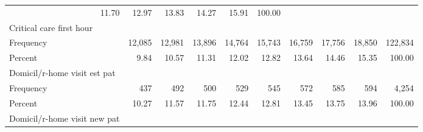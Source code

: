\documentclass{article}
\begin{document}
\begin{table}[!h]
\begin{tabular}{llllllllll}
  \multicolumn{1}{r}{11.70} &
  \multicolumn{1}{r}{12.97} &
  \multicolumn{1}{r}{13.83} &
  \multicolumn{1}{r}{14.27} &
  \multicolumn{1}{r}{15.91} &
  \multicolumn{1}{r}{100.00} \\
\multicolumn{1}{l}{\hspace{1em}Critical care first hour} &
  \multicolumn{1}{|r}{} &
  \multicolumn{1}{r}{} &
  \multicolumn{1}{r}{} &
  \multicolumn{1}{r}{} &
  \multicolumn{1}{r}{} &
  \multicolumn{1}{r}{} &
  \multicolumn{1}{r}{} &
  \multicolumn{1}{r}{} &
  \multicolumn{1}{r}{} \\
\multicolumn{1}{l}{\hspace{2em}Frequency} &
  \multicolumn{1}{|r}{12,085} &
  \multicolumn{1}{r}{12,981} &
  \multicolumn{1}{r}{13,896} &
  \multicolumn{1}{r}{14,764} &
  \multicolumn{1}{r}{15,743} &
  \multicolumn{1}{r}{16,759} &
  \multicolumn{1}{r}{17,756} &
  \multicolumn{1}{r}{18,850} &
  \multicolumn{1}{r}{122,834} \\
\multicolumn{1}{l}{\hspace{2em}Percent} &
  \multicolumn{1}{|r}{9.84} &
  \multicolumn{1}{r}{10.57} &
  \multicolumn{1}{r}{11.31} &
  \multicolumn{1}{r}{12.02} &
  \multicolumn{1}{r}{12.82} &
  \multicolumn{1}{r}{13.64} &
  \multicolumn{1}{r}{14.46} &
  \multicolumn{1}{r}{15.35} &
  \multicolumn{1}{r}{100.00} \\
\multicolumn{1}{l}{\hspace{1em}Domicil/r-home visit est pat} &
  \multicolumn{1}{|r}{} &
  \multicolumn{1}{r}{} &
  \multicolumn{1}{r}{} &
  \multicolumn{1}{r}{} &
  \multicolumn{1}{r}{} &
  \multicolumn{1}{r}{} &
  \multicolumn{1}{r}{} &
  \multicolumn{1}{r}{} &
  \multicolumn{1}{r}{} \\
\multicolumn{1}{l}{\hspace{2em}Frequency} &
  \multicolumn{1}{|r}{437} &
  \multicolumn{1}{r}{492} &
  \multicolumn{1}{r}{500} &
  \multicolumn{1}{r}{529} &
  \multicolumn{1}{r}{545} &
  \multicolumn{1}{r}{572} &
  \multicolumn{1}{r}{585} &
  \multicolumn{1}{r}{594} &
  \multicolumn{1}{r}{4,254} \\
\multicolumn{1}{l}{\hspace{2em}Percent} &
  \multicolumn{1}{|r}{10.27} &
  \multicolumn{1}{r}{11.57} &
  \multicolumn{1}{r}{11.75} &
  \multicolumn{1}{r}{12.44} &
  \multicolumn{1}{r}{12.81} &
  \multicolumn{1}{r}{13.45} &
  \multicolumn{1}{r}{13.75} &
  \multicolumn{1}{r}{13.96} &
  \multicolumn{1}{r}{100.00} \\
\multicolumn{1}{l}{\hspace{1em}Domicil/r-home visit new pat} &

\end{tabular}
\end{table}
\end{document}
